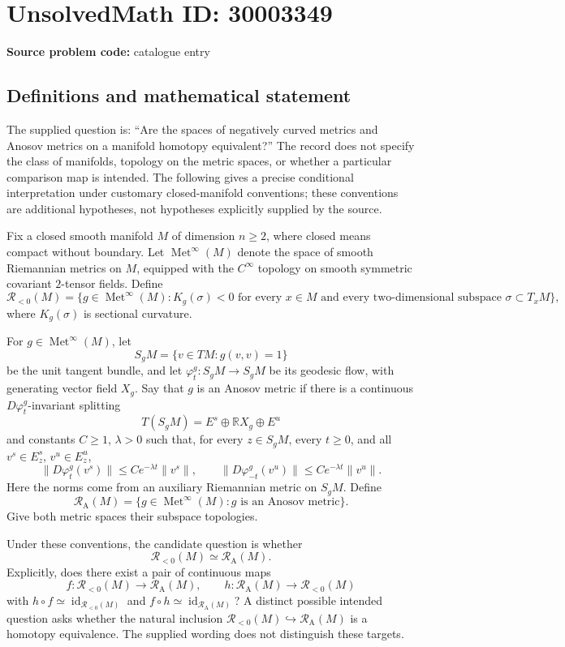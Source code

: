\documentclass[11pt]{article}
\newcommand{\R}{\mathbb{R}}
\begin{document}
\section*{UnsolvedMath ID: 30003349}
\textbf{Source problem code:} catalogue entry
\subsection{Definitions and mathematical statement}
The supplied question is: ``Are the spaces of negatively curved metrics and Anosov metrics on a manifold homotopy equivalent?'' The record does not specify the class of manifolds, topology on the metric spaces, or whether a particular comparison map is intended. The following gives a precise conditional interpretation under customary closed-manifold conventions; these conventions are additional hypotheses, not hypotheses explicitly supplied by the source.

Fix a closed smooth manifold \(M\) of dimension \(n\geq 2\), where closed means compact without boundary. Let \(\operatorname{Met}^{\infty}(M)\) denote the space of smooth Riemannian metrics on \(M\), equipped with the \(C^{\infty}\) topology on smooth symmetric covariant \(2\)-tensor fields. Define
\[
\mathcal{R}_{<0}(M)=\{g\in\operatorname{Met}^{\infty}(M):K_g(\sigma)<0\text{ for every }x\in M\text{ and every two-dimensional subspace }\sigma\subset T_xM\},
\]
where \(K_g(\sigma)\) is sectional curvature.

For \(g\in\operatorname{Met}^{\infty}(M)\), let
\[
S_gM=\{v\in TM:g(v,v)=1\}
\]
be the unit tangent bundle, and let \(\varphi_t^g:S_gM\to S_gM\) be its geodesic flow, with generating vector field \(X_g\). Say that \(g\) is an Anosov metric if there is a continuous \(D\varphi_t^g\)-invariant splitting
\[
T(S_gM)=E^s\oplus\R X_g\oplus E^u
\]
and constants \(C\geq1\), \(\lambda>0\) such that, for every \(z\in S_gM\), every \(t\geq0\), and all \(v^s\in E_z^s\), \(v^u\in E_z^u\),
\[
\|D\varphi_t^g(v^s)\|\leq Ce^{-\lambda t}\|v^s\|,
\qquad
\|D\varphi_{-t}^g(v^u)\|\leq Ce^{-\lambda t}\|v^u\|.
\]
Here the norms come from an auxiliary Riemannian metric on \(S_gM\). Define
\[
\mathcal{R}_{\mathrm A}(M)=\{g\in\operatorname{Met}^{\infty}(M):g\text{ is an Anosov metric}\}.
\]
Give both metric spaces their subspace topologies.

Under these conventions, the candidate question is whether
\[
\mathcal{R}_{<0}(M)\simeq\mathcal{R}_{\mathrm A}(M).
\]
Explicitly, does there exist a pair of continuous maps
\[
f:\mathcal{R}_{<0}(M)\longrightarrow\mathcal{R}_{\mathrm A}(M),\qquad
h:\mathcal{R}_{\mathrm A}(M)\longrightarrow\mathcal{R}_{<0}(M)
\]
with \(h\circ f\simeq\operatorname{id}_{\mathcal{R}_{<0}(M)}\) and \(f\circ h\simeq\operatorname{id}_{\mathcal{R}_{\mathrm A}(M)}\)? A distinct possible intended question asks whether the natural inclusion \(\mathcal{R}_{<0}(M)\hookrightarrow\mathcal{R}_{\mathrm A}(M)\) is a homotopy equivalence. The supplied wording does not distinguish these targets.
\end{document}
